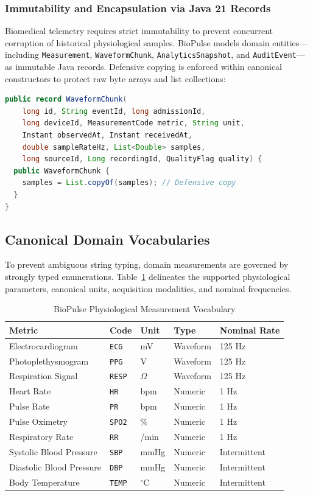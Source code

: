 \documentclass[10pt,journal,compsoc]{IEEEtran}
\begin{document}
\subsubsection{Immutability and Encapsulation via Java 21 Records}
Biomedical telemetry requires strict immutability to prevent concurrent corruption of historical physiological samples. BioPulse models domain entities—including \texttt{Measurement}, \texttt{WaveformChunk}, \texttt{AnalyticsSnapshot}, and \texttt{AuditEvent}—as immutable Java records. Defensive copying is enforced within canonical constructors to protect raw byte arrays and list collections:
\begin{lstlisting}[language=Java]
public record WaveformChunk(
    long id, String eventId, long admissionId,
    long deviceId, MeasurementCode metric, String unit,
    Instant observedAt, Instant receivedAt,
    double sampleRateHz, List<Double> samples,
    long sourceId, Long recordingId, QualityFlag quality) {
  public WaveformChunk {
    samples = List.copyOf(samples); // Defensive copy
  }
}
\end{lstlisting}

\subsection{Canonical Domain Vocabularies}
To prevent ambiguous string typing, domain measurements are governed by strongly typed enumerations. Table~\ref{tab:metrics} delineates the supported physiological parameters, canonical units, acquisition modalities, and nominal frequencies.

\begin{table}[!t]
\renewcommand{\arraystretch}{1.2}
\caption{BioPulse Physiological Measurement Vocabulary}
\label{tab:metrics}
\centering
\begin{tabular}{@{}lllll@{}}
\toprule
\textbf{Metric} & \textbf{Code} & \textbf{Unit} & \textbf{Type} & \textbf{Nominal Rate} \\
\midrule
Electrocardiogram & \texttt{ECG} & mV & Waveform & 125 Hz \\
Photoplethysmogram & \texttt{PPG} & V & Waveform & 125 Hz \\
Respiration Signal & \texttt{RESP} & $\Omega$ & Waveform & 125 Hz \\
Heart Rate & \texttt{HR} & bpm & Numeric & 1 Hz \\
Pulse Rate & \texttt{PR} & bpm & Numeric & 1 Hz \\
Pulse Oximetry & \texttt{SPO2} & \% & Numeric & 1 Hz \\
Respiratory Rate & \texttt{RR} & /min & Numeric & 1 Hz \\
Systolic Blood Pressure & \texttt{SBP} & mmHg & Numeric & Intermittent \\
Diastolic Blood Pressure & \texttt{DBP} & mmHg & Numeric & Intermittent \\
Body Temperature & \texttt{TEMP} & $^\circ$C & Numeric & Intermittent \\
\bottomrule
\end{tabular}
\end{table}
\end{document}
